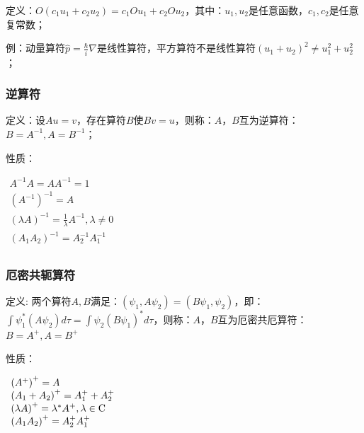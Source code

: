 定义：$O\left( {c_1 u_1  + c_2 u_2 } \right) = c_1 Ou_1  + c_2 Ou_2 $，其中：$u_1 ,u_2 $是任意函数，$c_1 ,c_2 $是任意复常数；

例：动量算符$\hat p = \frac{\hbar }{i}\nabla $是线性算符，平方算符不是线性算符$\left( {u_1  + u_2 } \right)^2  \ne u_1 ^2  + u_2 ^2 $；


\subsubsection{逆算符}

定义：设$Au = v$，存在算符$B$使$Bv = u$，则称：$A$，$B$互为逆算符：$B = A^{ - 1} ,A = B^{ - 1} $；

性质：

\begin{center}
$\begin{array}{l}
 A^{ - 1} A = AA^{ - 1}  = 1 \\
 \left( {A^{ - 1} } \right)^{ - 1}  = A \\
 \left( {\lambda A} \right)^{ - 1}  = \frac{1}{\lambda }A^{ - 1} ,\lambda  \ne 0 \\
 \left( {A_1 A_2 } \right)^{ - 1}  = A_2 ^{ - 1} A_1 ^{ - 1}  \\
 \end{array}$
\end{center}

\subsubsection{厄密共轭算符}


定义: 两个算符$A,B$满足：$\left( {\psi _1 ,A\psi _2 } \right) =
\left( {B\psi _1 ,\psi _2 } \right)$，即：$\int {\psi _1 ^* \left(
{A\psi _2 } \right)d\tau }  = \int {\psi _2 \left( {B\psi _1 }
\right)^* d\tau } $，则称：$A$，$B$互为厄密共厄算符：$B = A^ +  ,A =
B^ +  $


性质：

\begin{center}
$\begin{array}{l}
 \left( {A^ +  } \right)^ +   = A \\
 \left( {A_1  + A_2 } \right)^ +   = A_1 ^ +   + A_2 ^ +   \\
 \left( {\lambda A} \right)^ +   = \lambda ^* A^ +  ,\lambda  \in {\rm{C}} \\
 \left( {A_1 A_2 } \right)^ +   = A_2 ^ +  A_1 ^ +   \\
 \end{array}$
\end{center}

